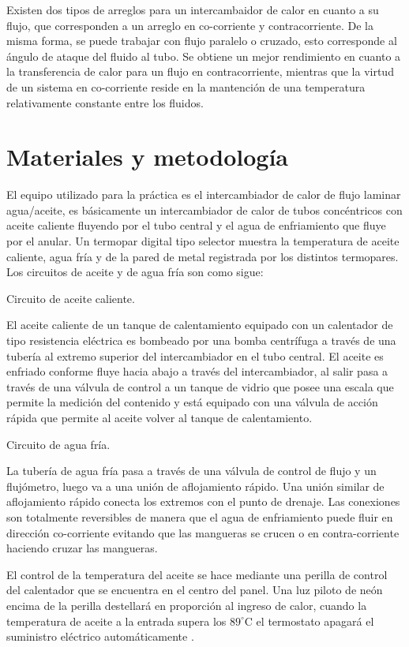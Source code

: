 \documentclass[journal, a4paper]{IEEEtran}
\begin{document}
Existen dos tipos de arreglos para un intercambaidor de calor en cuanto a su flujo, que corresponden a un arreglo en co-corriente y contracorriente. De la misma forma, se puede trabajar con flujo paralelo o cruzado, esto corresponde al \'angulo de ataque del fluido al tubo. Se obtiene un mejor rendimiento en cuanto a la transferencia de calor para un flujo en contracorriente, mientras que la virtud de un sistema en co-corriente reside en la mantenci\'on de una temperatura relativamente constante entre los fluidos. 

\section{Materiales y metodolog\'ia}
 El equipo utilizado para la pr\'actica es el intercambiador de calor de flujo laminar agua/aceite, es b\'asicamente un intercambiador de calor de tubos conc\'entricos con aceite caliente fluyendo por el tubo central y el agua de enfriamiento que fluye por el anular.
    Un termopar digital tipo selector muestra la temperatura de aceite caliente, agua fr\'ia y de la pared de metal registrada por los distintos termopares. Los circuitos de aceite y de agua fr\'ia son como sigue:
    
    
Circuito de aceite caliente.


El aceite caliente de un tanque de calentamiento equipado con un calentador de tipo resistencia el\'ectrica es bombeado por una bomba centr\'ifuga a trav\'es de una tuber\'ia al extremo superior del intercambiador en el tubo central. 
El aceite es enfriado conforme fluye hacia abajo a trav\'es del intercambiador, al salir pasa a trav\'es de una v\'alvula de control a un tanque de vidrio que posee una escala que permite la medici\'on del contenido y est\'a equipado con una v\'alvula de acci\'on r\'apida que permite al aceite volver al tanque de calentamiento.


Circuito de agua fr\'ia.


La tuber\'ia de agua fr\'ia pasa a trav\'es de una v\'alvula de control de flujo y un fluj\'ometro, luego va a una uni\'on de aflojamiento r\'apido. Una uni\'on similar de aflojamiento r\'apido conecta los extremos con el punto de drenaje. Las conexiones son totalmente reversibles de manera que el agua de enfriamiento puede fluir en direcci\'on co-corriente evitando que las mangueras se crucen o en contra-corriente haciendo cruzar las mangueras. 

El control de la temperatura del aceite se hace mediante una perilla de control del calentador que se encuentra en el centro del panel. Una luz piloto de ne\'on encima de la perilla destellar\'a en proporci\'on al ingreso de calor, cuando la temperatura de aceite a la entrada supera los $89^{\circ}$C el termostato apagar\'a el suministro el\'ectrico autom\'aticamente \cite{edibon}.
\end{document}
